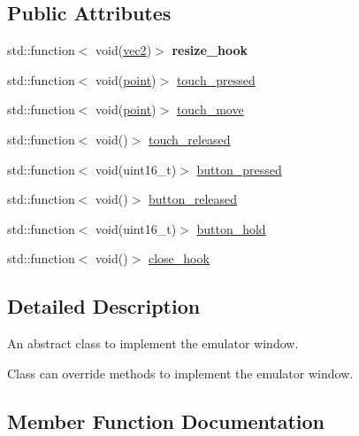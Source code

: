 \subsection*{Public Attributes}
\begin{DoxyCompactItemize}
\item 
\mbox{\label{classeka2l1_1_1driver_1_1emu__window_a40fbd4a9fa68d018a3adc5ccb9b1686a}} 
std\+::function$<$ void(\mbox{\hyperlink{structeka2l1_1_1vec2}{vec2}})$>$ {\bfseries resize\+\_\+hook}
\item 
std\+::function$<$ void(\mbox{\hyperlink{structeka2l1_1_1vec2}{point}})$>$ \mbox{\hyperlink{classeka2l1_1_1driver_1_1emu__window_aeb86b282270d6337f1287fc2b3165ffa}{touch\+\_\+pressed}}
\item 
std\+::function$<$ void(\mbox{\hyperlink{structeka2l1_1_1vec2}{point}})$>$ \mbox{\hyperlink{classeka2l1_1_1driver_1_1emu__window_a31c90ce3da4e00b413d711de299e258d}{touch\+\_\+move}}
\item 
std\+::function$<$ void()$>$ \mbox{\hyperlink{classeka2l1_1_1driver_1_1emu__window_a5a4842a02ac34fd4f9ca960399c2d30b}{touch\+\_\+released}}
\item 
std\+::function$<$ void(uint16\+\_\+t)$>$ \mbox{\hyperlink{classeka2l1_1_1driver_1_1emu__window_aeda1056d81f9d4e309725b09fd97e365}{button\+\_\+pressed}}
\item 
std\+::function$<$ void()$>$ \mbox{\hyperlink{classeka2l1_1_1driver_1_1emu__window_a2f0a1fbaadf267530b0daaeb4984a5a4}{button\+\_\+released}}
\item 
std\+::function$<$ void(uint16\+\_\+t)$>$ \mbox{\hyperlink{classeka2l1_1_1driver_1_1emu__window_a87a730c6540ff96939c25b2ba2912e4c}{button\+\_\+hold}}
\item 
std\+::function$<$ void()$>$ \mbox{\hyperlink{classeka2l1_1_1driver_1_1emu__window_a01b6281126b6b85411db2195722fe27b}{close\+\_\+hook}}
\end{DoxyCompactItemize}


\subsection{Detailed Description}
An abstract class to implement the emulator window. 

Class can override methods to implement the emulator window. 

\subsection{Member Function Documentation}
\mbox{\label{classeka2l1_1_1driver_1_1emu__window_a5cc29dfd4fd4de6b760bb33442a9a654}} 
